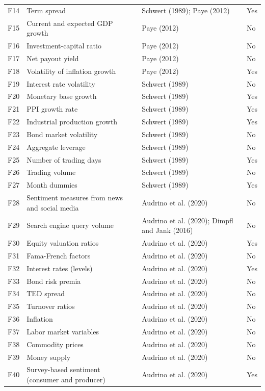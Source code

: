 {\begin{longtable}{>{\raggedright\arraybackslash}m{0.7cm}>{\raggedright\arraybackslash}m{5.5cm}>{\raggedright\arraybackslash}m{5.1cm}>{\raggedleft\arraybackslash}m{1.5cm}}
F14 & Term spread & Schwert (1989); Paye (2012) & Yes \\
F15 & Current and expected GDP growth & Paye (2012) & No \\
F16 & Investment-capital ratio & Paye (2012) & No \\
F17 & Net payout yield & Paye (2012) & No \\
F18 & Volatility of inflation growth & Paye (2012) & Yes \\
F19 & Interest rate volatility & Schwert (1989) & No \\
F20 & Monetary base growth & Schwert (1989) & Yes \\
F21 & PPI growth rate & Schwert (1989) & Yes \\
F22 & Industrial production growth & Schwert (1989) & Yes \\
F23 & Bond market volatility & Schwert (1989) & No \\
F24 & Aggregate leverage & Schwert (1989) & No \\
F25 & Number of trading days & Schwert (1989) & Yes \\
F26 & Trading volume & Schwert (1989) & No \\
F27 & Month dummies & Schwert (1989) & Yes \\
F28 & Sentiment measures from news and social media & Audrino et al. (2020) & No \\
F29 & Search engine query volume & Audrino et al. (2020); Dimpfl and Jank (2016) & No \\
F30 & Equity valuation ratios & Audrino et al. (2020) & Yes \\
F31 & Fama-French factors & Audrino et al. (2020) & No \\
F32 & Interest rates (levels) & Audrino et al. (2020) & Yes \\
F33 & Bond risk premia & Audrino et al. (2020) & No \\
F34 & TED spread & Audrino et al. (2020) & No \\
F35 & Turnover ratios & Audrino et al. (2020) & No \\
F36 & Inflation & Audrino et al. (2020) & No \\
F37 & Labor market variables & Audrino et al. (2020) & No \\
F38 & Commodity prices & Audrino et al. (2020) & No \\
F39 & Money supply & Audrino et al. (2020) & No \\
F40 & Survey-based sentiment (consumer and producer) & Audrino et al. (2020) & Yes \\

\end{longtable}}
